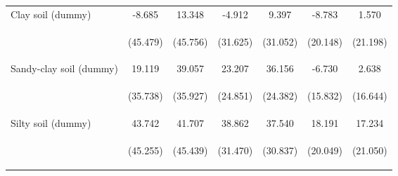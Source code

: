 \begin{center}
\begin{tabular}{lcccccc}
Clay soil (dummy) & -8.685 & 13.348 & -4.912 & 9.397 & -8.783 & 1.570 \\
\vspace{4pt} & \begin{footnotesize}(45.479)\end{footnotesize} & \begin{footnotesize}(45.756)\end{footnotesize} & \begin{footnotesize}(31.625)\end{footnotesize} & \begin{footnotesize}(31.052)\end{footnotesize} & \begin{footnotesize}(20.148)\end{footnotesize} & \begin{footnotesize}(21.198)\end{footnotesize} \\
Sandy-clay soil (dummy) & 19.119 & 39.057 & 23.207 & 36.156 & -6.730 & 2.638 \\
\vspace{4pt} & \begin{footnotesize}(35.738)\end{footnotesize} & \begin{footnotesize}(35.927)\end{footnotesize} & \begin{footnotesize}(24.851)\end{footnotesize} & \begin{footnotesize}(24.382)\end{footnotesize} & \begin{footnotesize}(15.832)\end{footnotesize} & \begin{footnotesize}(16.644)\end{footnotesize} \\
Silty soil (dummy) & 43.742 & 41.707 & 38.862 & 37.540 & 18.191 & 17.234 \\
\vspace{4pt} & \begin{footnotesize}(45.255)\end{footnotesize} & \begin{footnotesize}(45.439)\end{footnotesize} & \begin{footnotesize}(31.470)\end{footnotesize} & \begin{footnotesize}(30.837)\end{footnotesize} & \begin{footnotesize}(20.049)\end{footnotesize} & \begin{footnotesize}(21.050)\end{footnotesize} \\

\end{tabular}
\end{center}
